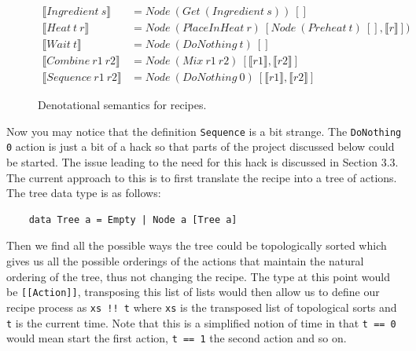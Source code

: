 \documentclass[11pt]{article}
\begin{document}
    \newpage

    \begin{figure}[ht]
        \centering\small
            \begin{align*}
            \llbracket Ingredient \: s \rrbracket &= Node \: (Get \: (Ingredient \: s)) \: [] \\
            \llbracket Heat \: t \: r \rrbracket &= Node \:(PlaceInHeat \: r) \:
                [Node \: (Preheat \: t) \: [], \llbracket r \rrbracket]) \\
            \llbracket Wait \: t \rrbracket &= Node \: (DoNothing \: t) \: [] \\
            \llbracket Combine \: r1 \: r2 \rrbracket &=
                Node \: (Mix \: r1 \: r2) \: [\llbracket r1 \rrbracket , \llbracket r2 \rrbracket] \\
            \llbracket Sequence \: r1 \: r2 \rrbracket &=
                Node \: (DoNothing \: 0) \: [\llbracket r1 \rrbracket , \llbracket r2 \rrbracket]
            \end{align*}
        \caption{Denotational semantics for recipes.}
    \end{figure}

    Now you may notice that the definition \texttt{Sequence} is a bit strange. The
    \texttt{DoNothing 0} action is just a bit of a hack so that parts of the project
    discussed below could be started. The issue leading to the need for this hack
    is discussed in Section 3.3. \\
        
    The current approach to this is to first translate the recipe into a tree of actions.
    The tree data type is as follows: \\
    \begin{tt}
    \small
    \begin{lstlisting}
    data Tree a = Empty | Node a [Tree a]
    \end{lstlisting}
    \end{tt}

    Then we find all the possible ways the tree could be topologically sorted which
    gives us all the possible orderings of the actions that maintain the natural
    ordering of the tree, thus not changing the recipe. The type at this point would
    be \texttt{[[Action]]}, transposing this list of lists would then allow us to
    define our recipe process as \texttt{xs !! t} where \texttt{xs} is the transposed
    list of topological sorts and \texttt{t} is the current time. Note that this
    is a simplified notion of time in that \texttt{t == 0} would mean start the first
    action, \texttt{t == 1} the second action and so on.
\end{document}
